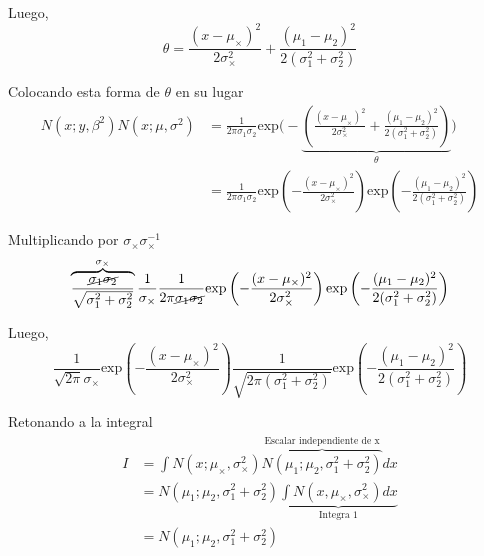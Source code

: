 \documentclass[article]{jss}
\begin{document}
\begin{appendix}
Luego,
\begin{equation}
 \theta = \frac{(x-\mu_{\times})^2}{2\sigma_{\times}^2} + \frac{(\mu_1 - \mu_2)^2}{2(\sigma_1^2 + \sigma_2^2)} 
\end{equation}

Colocando esta forma de $\theta$ en su lugar
\begin{equation}
\begin{split}
 N(x;y,\beta^2)N(x;\mu,\sigma^2) & = \frac{1}{2\pi\sigma_1\sigma_2}\text{exp}\Bigg(-\underbrace{\left( \frac{(x-\mu_{\times})^2}{2\sigma_{\times}^2} + \frac{(\mu_1 - \mu_2)^2}{2(\sigma_1^2 + \sigma_2^2)} \right)}_{\theta} \Bigg) \\
 & = \frac{1}{2\pi\sigma_1\sigma_2}\text{exp}\left(  - \frac{(x-\mu_{\times})^2}{2\sigma_{\times}^2} \right) \text{exp} \left( - \frac{(\mu_1 - \mu_2)^2}{2(\sigma_1^2 + \sigma_2^2)} \right) 
\end{split}
\end{equation}

Multiplicando por $\sigma_{\times}\sigma_{\times}^{-1}$
\begin{equation}
\overbrace{\frac{\cancel{\sigma_1\sigma_2}}{\sqrt{\sigma_1^2+\sigma_2^2}}}^{\sigma_{\times}} \frac{1}{\sigma_{\times}} \frac{1}{2\pi\cancel{\sigma_1\sigma_2}}\text{exp}\left(  - \frac{(x-\mu_{\times})^2}{2\sigma_{\times}^2} \right) \text{exp} \left( - \frac{(\mu_1 - \mu_2)^2}{2(\sigma_1^2 + \sigma_2^2)} \right)
\end{equation}

Luego,
\begin{equation}
 \frac{1}{\sqrt{2\pi}\sigma_{\times}}\text{exp}\left(  - \frac{(x-\mu_{\times})^2}{2\sigma_{\times}^2} \right) \frac{1}{\sqrt{2\pi(\sigma_1^2+\sigma_2^2)}} \text{exp} \left( - \frac{(\mu_1 - \mu_2)^2}{2(\sigma_1^2 + \sigma_2^2)} \right)
\end{equation}

Retonando a la integral
\begin{equation}
\begin{split}
I & = \int N(x;\mu_{\times},\sigma_{\times}^2) \overbrace{N(\mu_1;\mu_2,\sigma_1^2 + \sigma_2^2)}^{\text{Escalar independiente de x}} dx \\[0.3cm]
& = N(\mu_1;\mu_2,\sigma_1^2 + \sigma_2^2) \underbrace{\int N(x,\mu_{\times},\sigma_{\times}^2)  dx}_{\text{Integra 1}} \\
& = N(\mu_1;\mu_2,\sigma_1^2 + \sigma_2^2)
\end{split}
\end{equation}


\end{appendix}
\end{document}
